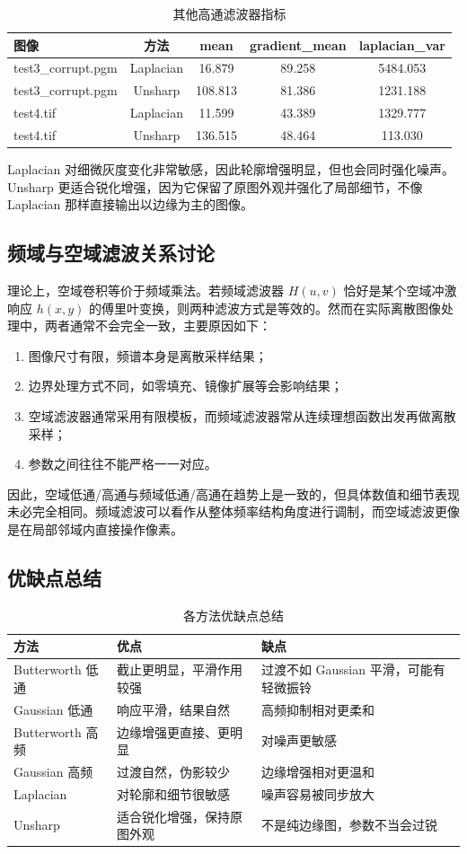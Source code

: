 \documentclass[UTF8,a4paper,12pt]{ctexart}
\begin{document}
\begin{table}[H]
\centering
\caption{其他高通滤波器指标}
\begin{tabular}{lcccc}
\toprule
图像 & 方法 & mean & gradient\_mean & laplacian\_var \\
\midrule
test3\_corrupt.pgm & Laplacian & 16.879 & 89.258 & 5484.053 \\
test3\_corrupt.pgm & Unsharp & 108.813 & 81.386 & 1231.188 \\
test4.tif & Laplacian & 11.599 & 43.389 & 1329.777 \\
test4.tif & Unsharp & 136.515 & 48.464 & 113.030 \\
\bottomrule
\end{tabular}
\end{table}

Laplacian 对细微灰度变化非常敏感，因此轮廓增强明显，但也会同时强化噪声。Unsharp 更适合锐化增强，因为它保留了原图外观并强化了局部细节，不像 Laplacian 那样直接输出以边缘为主的图像。

\subsection{频域与空域滤波关系讨论}
理论上，空域卷积等价于频域乘法。若频域滤波器 $H(u,v)$ 恰好是某个空域冲激响应 $h(x,y)$ 的傅里叶变换，则两种滤波方式是等效的。然而在实际离散图像处理中，两者通常不会完全一致，主要原因如下：
\begin{enumerate}
  \item 图像尺寸有限，频谱本身是离散采样结果；
  \item 边界处理方式不同，如零填充、镜像扩展等会影响结果；
  \item 空域滤波器通常采用有限模板，而频域滤波器常从连续理想函数出发再做离散采样；
  \item 参数之间往往不能严格一一对应。
\end{enumerate}
因此，空域低通/高通与频域低通/高通在趋势上是一致的，但具体数值和细节表现未必完全相同。频域滤波可以看作从整体频率结构角度进行调制，而空域滤波更像是在局部邻域内直接操作像素。

\subsection{优缺点总结}
\begin{table}[H]
\centering
\caption{各方法优缺点总结}
\begin{tabular}{p{3cm}p{5cm}p{5cm}}
\toprule
方法 & 优点 & 缺点 \\
\midrule
Butterworth 低通 & 截止更明显，平滑作用较强 & 过渡不如 Gaussian 平滑，可能有轻微振铃 \\
Gaussian 低通 & 响应平滑，结果自然 & 高频抑制相对更柔和 \\
Butterworth 高频 & 边缘增强更直接、更明显 & 对噪声更敏感 \\
Gaussian 高频 & 过渡自然，伪影较少 & 边缘增强相对更温和 \\
Laplacian & 对轮廓和细节很敏感 & 噪声容易被同步放大 \\
Unsharp & 适合锐化增强，保持原图外观 & 不是纯边缘图，参数不当会过锐 \\
\bottomrule
\end{tabular}
\end{table}
\end{document}
